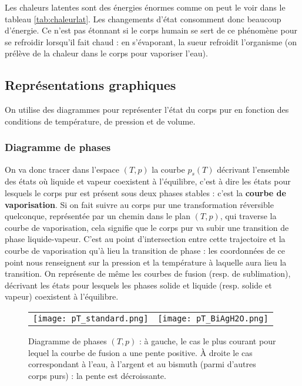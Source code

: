 \documentclass[11pt,a4paper]{report}
\begin{document}
Les chaleurs latentes sont des énergies énormes comme on peut le voir dans le tableau \ref{tab:chaleurlat}. Les changements d'état consomment donc beaucoup d'énergie. Ce n'est pas étonnant si le corps humain se sert de ce phénomène pour se refroidir lorsqu'il fait chaud : en s'évaporant, la sueur refroidit l'organisme (on prélève de la chaleur dans le corps pour vaporiser l'eau).

\subsection{Représentations graphiques}

On utilise des diagrammes pour représenter l'état du corps pur en fonction des conditions de température, de pression et de volume.

\subsubsection*{Diagramme de phases}

On va donc tracer dans l'espace $(T,p)$ la courbe $p_s(T)$ décrivant l'ensemble des états où liquide et vapeur coexistent à l'équilibre, c'est à dire les états pour lesquels le corps pur est présent sous deux phases stables : c'est la \textbf{courbe de vaporisation}. Si on fait suivre au corps pur une transformation réversible quelconque, représentée par un chemin dans le plan $(T,p)$, qui traverse la courbe de vaporisation, cela signifie que le corps pur va subir une transition de phase liquide-vapeur. C'est au point d'intersection entre cette trajectoire et la courbe de vaporisation qu'à lieu la transition de phase : les coordonnées de ce point nous renseignent sur la pression et la température à laquelle aura lieu la transition. On représente de même les courbes de fusion (resp. de sublimation), décrivant les états pour lesquels les phases solide et liquide (resp. solide et vapeur) coexistent à l'équilibre.

\begin{figure}[h!]
	\begin{center}
		\begin{tabular}{cc}
			\texttt{[image: pT\_standard.png]}&
			\texttt{[image: pT\_BiAgH2O.png]}\\
		\end{tabular}
	\end{center}
	\caption{Diagramme de phases $(T,p)$ : à gauche, le cas le plus courant pour lequel la courbe de fusion a une pente positive. \`A droite le cas correspondant à l'eau, à l'argent et au bismuth 	(parmi d'autres corps purs) : la pente est décroissante.}
\end{figure}
\end{document}
